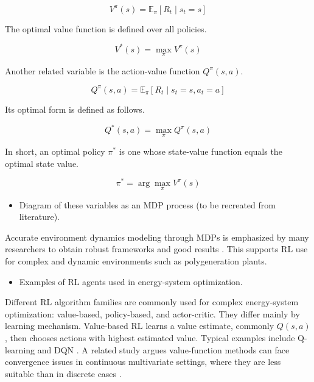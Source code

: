 \begin{equation}
\label{eq:state_value}
V^{\pi}(s) = \mathbb{E}_{\pi}[R_t \mid s_t = s]
\end{equation}

The optimal value function is defined over all policies.

\begin{equation}
\label{eq:optimal_state_value}
V^{*}(s) = \max_{\pi} V^{\pi}(s)
\end{equation}

Another related variable is the action-value function $Q^{\pi}(s,a)$.

\begin{equation}
\label{eq:action_value}
Q^{\pi}(s,a) = \mathbb{E}_{\pi}[R_t \mid s_t = s, a_t = a]
\end{equation}

Its optimal form is defined as follows.

\begin{equation}
\label{eq:optimal_action_value}
Q^{*}(s,a) = \max_{\pi} Q^{\pi}(s,a)
\end{equation}

In short, an optimal policy $\pi^*$ is one whose state-value function equals the optimal state value.

\begin{equation}
\label{eq:optimal_policy}
\pi^{*} = \arg\max_{\pi} V^{\pi}(s)
\end{equation}

\begin{itemize}
\item Diagram of these variables as an MDP process (to be recreated from literature).
\end{itemize}

Accurate environment dynamics modeling through MDPs is emphasized by many researchers to obtain robust frameworks and good results \cite{langford2011efficientExploration}. This supports RL use for complex and dynamic environments such as polygeneration plants.

\begin{itemize}
\item Examples of RL agents used in energy-system optimization.
\end{itemize}

Different RL algorithm families are commonly used for complex energy-system optimization: value-based, policy-based, and actor-critic. They differ mainly by learning mechanism. Value-based RL learns a value estimate, commonly $Q(s,a)$, then chooses actions with highest estimated value. Typical examples include Q-learning and DQN \cite{liu2020overviewValuePolicy}. A related study argues value-function methods can face convergence issues in continuous multivariate settings, where they are less suitable than in discrete cases \cite{lincoln2012comparingPolicyGradient}.

